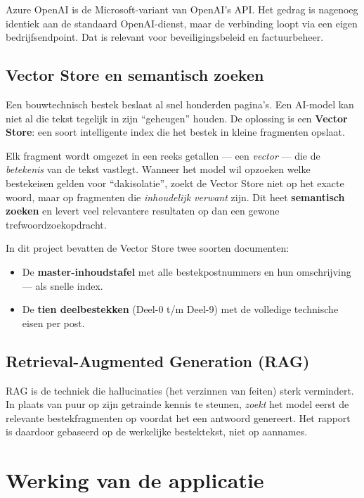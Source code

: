 \documentclass[a4paper,11pt]{article}
\begin{document}
Azure OpenAI is de Microsoft-variant van OpenAI's API. Het gedrag is
nagenoeg identiek aan de standaard OpenAI-dienst, maar de verbinding
loopt via een eigen bedrijfsendpoint. Dat is relevant voor
beveiligingsbeleid en factuurbeheer.

\subsection{Vector Store en semantisch zoeken}

Een bouwtechnisch bestek beslaat al snel honderden pagina's. Een AI-model
kan niet al die tekst tegelijk in zijn ``geheugen'' houden. De oplossing
is een \textbf{Vector Store}: een soort intelligente index die het bestek
in kleine fragmenten opslaat.

Elk fragment wordt omgezet in een reeks getallen --- een \emph{vector}
--- die de \emph{betekenis} van de tekst vastlegt. Wanneer het model wil
opzoeken welke bestekeisen gelden voor ``dakisolatie'', zoekt de Vector
Store niet op het exacte woord, maar op fragmenten die \emph{inhoudelijk
verwant} zijn. Dit heet \textbf{semantisch zoeken} en levert veel
relevantere resultaten op dan een gewone trefwoordzoekopdracht.

In dit project bevatten de Vector Store twee soorten documenten:
\begin{itemize}
    \item De \textbf{master-inhoudstafel} met alle bestekpostnummers en hun
          omschrijving --- als snelle index.
    \item De \textbf{tien deelbestekken} (Deel-0 t/m Deel-9) met de volledige
          technische eisen per post.
\end{itemize}

\subsection{Retrieval-Augmented Generation (RAG)}

RAG is de techniek die hallucinaties (het verzinnen van feiten) sterk
vermindert. In plaats van puur op zijn getrainde kennis te steunen,
\emph{zoekt} het model eerst de relevante bestekfragmenten op voordat het
een antwoord genereert. Het rapport is daardoor gebaseerd op de werkelijke
bestektekst, niet op aannames.

\section{Werking van de applicatie}
\end{document}
